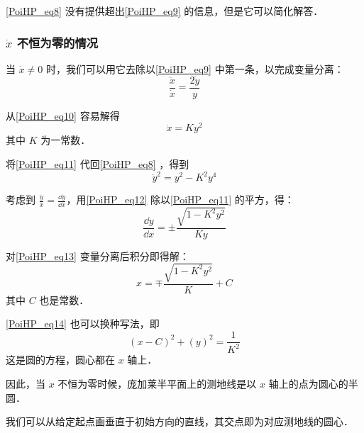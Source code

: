 \autoref{PoiHP_eq8} 没有提供超出\autoref{PoiHP_eq9} 的信息，但是它可以简化解答．

\subsubsection{$\dot{x}$ 不恒为零的情况}

{}%

当 $\dot{x}\ne 0$ 时，我们可以用它去除以\autoref{PoiHP_eq9} 中第一条，以完成变量分离：
\begin{equation}\label{PoiHP_eq10}
\frac{\ddot{x}}{\dot{x}}=\frac{2\dot{y}}{y}
\end{equation}

从\autoref{PoiHP_eq10} 容易解得
\begin{equation}\label{PoiHP_eq11}
\dot{x}=Ky^2
\end{equation}
其中 $K$ 为一常数．

将\autoref{PoiHP_eq11} 代回\autoref{PoiHP_eq8} ，得到
\begin{equation}\label{PoiHP_eq12}
\dot{y}^2=y^2-K^2y^4
\end{equation}

考虑到 $\frac{\dot{y}}{\dot{x}}=\frac{\dd y}{\dd x}$，用\autoref{PoiHP_eq12} 除以\autoref{PoiHP_eq11} 的平方，得：
\begin{equation}\label{PoiHP_eq13}
\frac{\dd y}{\dd x}=\pm\frac{\sqrt{1-K^2y^2}}{Ky}
\end{equation}

对\autoref{PoiHP_eq13} 变量分离后积分即得解：
\begin{equation}\label{PoiHP_eq14}
x=\mp\frac{\sqrt{1-K^2y^2}}{K}+C
\end{equation}
其中 $C$ 也是常数．

\autoref{PoiHP_eq14} 也可以换种写法，即
\begin{equation}
(x-C)^2+(y)^2=\frac{1}{K^2}
\end{equation}
这是圆的方程，圆心都在 $x$ 轴上．

因此，当 $\dot{x}$ 不恒为零时候，庞加莱半平面上的测地线是以 $x$ 轴上的点为圆心的半圆．

我们可以从给定起点画垂直于初始方向的直线，其交点即为对应测地线的圆心．

